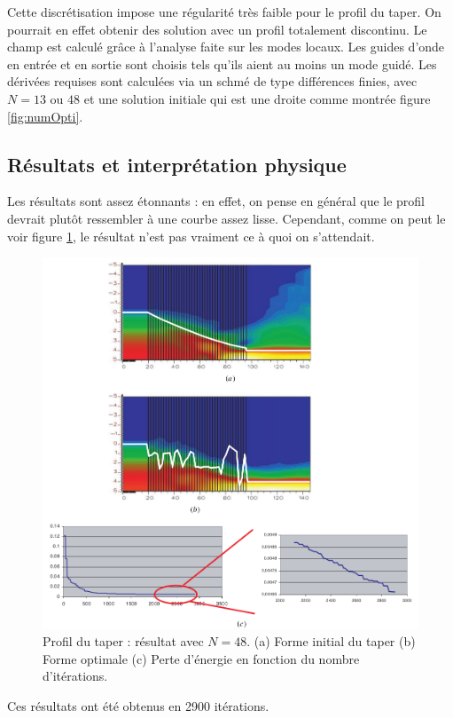 \documentclass{article}
\begin{document}
\bigskip
Cette discrétisation impose une régularité très faible pour le profil du taper. On pourrait en effet obtenir des solution avec un profil totalement discontinu. Le champ est calculé grâce à l'analyse faite sur les modes locaux. Les guides d'onde en entrée et en sortie sont choisis tels qu'ils aient au moins un mode guidé. Les dérivées requises sont calculées via un schmé de type différences finies, avec $N=13$ ou $48$ et une solution initiale qui est une droite comme montrée figure \ref{fig:numOpti}.

\subsection{Résultats et interprétation physique}
Les résultats sont assez étonnants : en effet, on pense en général que le profil devrait plutôt ressembler à une courbe assez lisse. Cependant, comme on peut le voir figure \ref{fig:result48}, le résultat n'est pas vraiment ce à quoi on s'attendait. 
\begin{figure}[!h]
	\centering
	\includegraphics[scale=0.25]{images/result48.png}
	\caption{Profil du taper : résultat avec $N=48$. (a) Forme initial du taper (b) Forme optimale (c) Perte d'énergie en fonction du nombre d'itérations.}
	\label{fig:result48}
\end{figure}
Ces résultats ont été obtenus en 2900 itérations.\\
\end{document}
